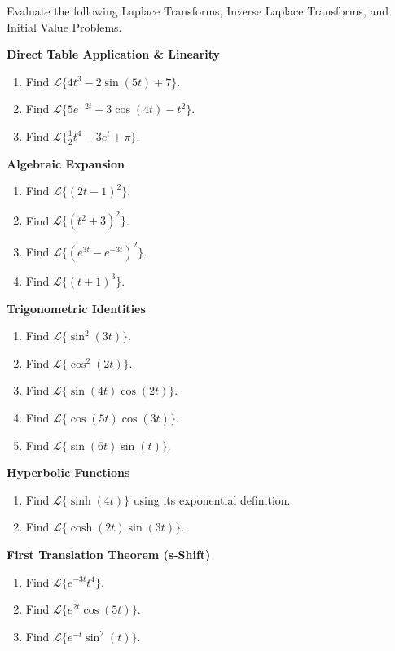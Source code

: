 \documentclass[11pt, letterpaper]{article}
\theoremstyle{definition}
\theoremstyle{remark}
\begin{document}
Evaluate the following Laplace Transforms, Inverse Laplace Transforms, and Initial Value Problems.

\textbf{Direct Table Application \& Linearity}
\begin{enumerate}[label=\textbf{\arabic*.}]
    \item Find $\mathscr{L}\{4t^3 - 2\sin(5t) + 7\}$.
    \item Find $\mathscr{L}\{5e^{-2t} + 3\cos(4t) - t^2\}$.
    \item Find $\mathscr{L}\{\frac{1}{2}t^4 - 3e^{t} + \pi\}$.
\end{enumerate}

\textbf{Algebraic Expansion}
\begin{enumerate}[label=\textbf{\arabic*.}, resume]
    \item Find $\mathscr{L}\{(2t - 1)^2\}$.
    \item Find $\mathscr{L}\{(t^2 + 3)^2\}$.
    \item Find $\mathscr{L}\{(e^{3t} - e^{-3t})^2\}$.
    \item Find $\mathscr{L}\{(t+1)^3\}$.
\end{enumerate}

\textbf{Trigonometric Identities}
\begin{enumerate}[label=\textbf{\arabic*.}, resume]
    \item Find $\mathscr{L}\{\sin^2(3t)\}$.
    \item Find $\mathscr{L}\{\cos^2(2t)\}$.
    \item Find $\mathscr{L}\{\sin(4t)\cos(2t)\}$.
    \item Find $\mathscr{L}\{\cos(5t)\cos(3t)\}$.
    \item Find $\mathscr{L}\{\sin(6t)\sin(t)\}$.
\end{enumerate}

\textbf{Hyperbolic Functions}
\begin{enumerate}[label=\textbf{\arabic*.}, resume]
    \item Find $\mathscr{L}\{\sinh(4t)\}$ using its exponential definition.
    \item Find $\mathscr{L}\{\cosh(2t)\sin(3t)\}$.
\end{enumerate}

\textbf{First Translation Theorem (s-Shift)}
\begin{enumerate}[label=\textbf{\arabic*.}, resume]
    \item Find $\mathscr{L}\{e^{-3t}t^4\}$.
    \item Find $\mathscr{L}\{e^{2t}\cos(5t)\}$.
    \item Find $\mathscr{L}\{e^{-t}\sin^2(t)\}$.
\end{enumerate}
\end{document}
